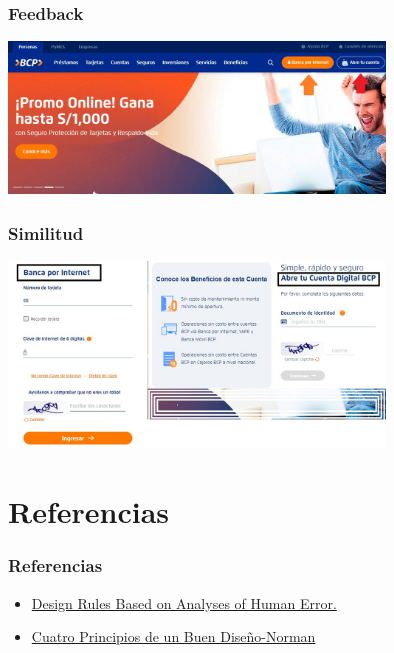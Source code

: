 \documentclass[11pt]{beamer}
\begin{document}
\begin{frame}
\frametitle{Feedback}

{\includegraphics[width=10.0cm]{img/feedback.jpg}}

\end{frame}

\begin{frame}
\frametitle{Similitud}

{\includegraphics[width=10.0cm]{img/similitud.jpg}}

\end{frame}


\section{Referencias}
\begin{frame}
\frametitle{Referencias}
\begin{itemize}
\item \href{https://www.researchgate.net/publication/220424605_Design_Rules_Based_on_Analyses_of_Human_Error}{Design Rules Based on Analyses of Human Error.}
\item \href{http://www.webnova.com.ar/los-cuatro-principios-del-buen-diseno-de-donald-norman/}{Cuatro Principios de un Buen Diseño-Norman}
\end{itemize}
\end{frame}
\end{document}
